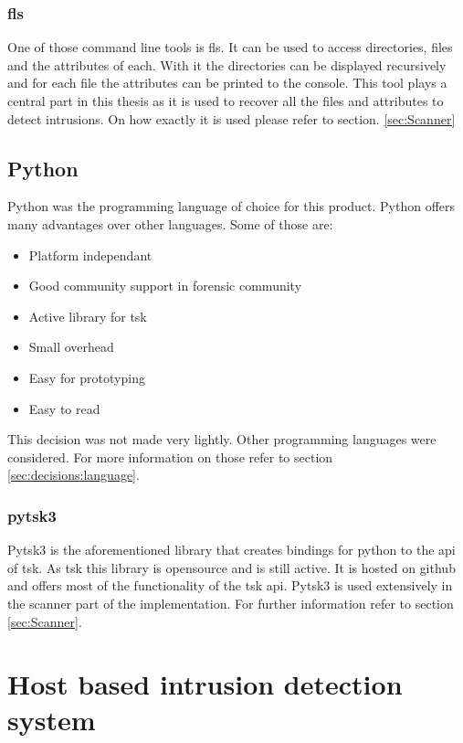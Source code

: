 \documentclass[
	a4paper,					%
	10pt,							%
	twoside,					%
	openright,				%
	notitlepage,			%
	parskip=half,			%
]{scrreprt}					%
\begin{document}
\subsubsection{fls}
\label{sec:fls}

One of those command line tools is fls. It can be used to access directories, files and the attributes of each. With it the directories can be displayed recursively and for each file the attributes can be printed to the console. \cite{tsk:fls} This tool plays a central part in this thesis as it is used to recover all the files and attributes to detect intrusions. On how exactly it is used please refer to section. \ref{sec:Scanner}

\subsection{Python}
\label{sec:python}

Python was the programming language of choice for this product. Python offers many advantages over other languages. Some of those are:

\begin{itemize}
	\item Platform independant
	\item Good community support in forensic community
	\item Active library for \gls{tsk}
	\item Small overhead
	\item Easy for prototyping
	\item Easy to read
\end{itemize}

This decision was not made very lightly. Other programming languages were considered. For more information on those refer to section \ref{sec:decisions:language}.

\subsubsection{pytsk3}
\label{sec:pytsk3}

Pytsk3 is the aforementioned library that creates bindings for python to the \gls{api} of \gls{tsk}. As \gls{tsk} this library is \gls{opensource} and is still active. It is hosted on \gls{github} and offers most of the functionality of the \gls{tsk} \gls{api}. Pytsk3 is used extensively in the scanner part of the implementation. For further information refer to section \ref{sec:Scanner}.

\section{Host based intrusion detection system}
\label{sec:hids}
\end{document}
